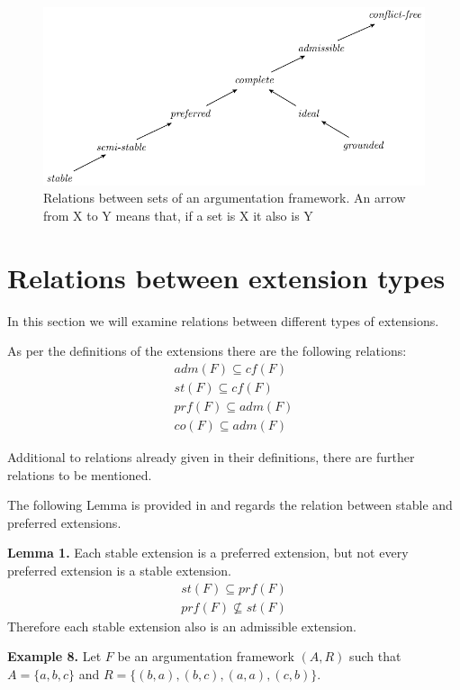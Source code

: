 \documentclass[draft,final]{vutinfth} %
\newcommand{\hl}{\par\vspace{6pt}} %
\newcommand{\cl}{\par\vspace{12pt}} %
\begin{document}
\FloatBarrier
	\begin{figure}[!h]
		\centering
		\includegraphics[scale=1]{graphs/diagram_2.pdf}
		\caption[Relations between sets of an argumentation framework]{Relations between sets of an argumentation framework. An arrow from X to Y means that, if a set is X it also is Y}
	\end{figure}
\FloatBarrier

\section{Relations between extension types}
In this section we will examine relations between different types of extensions.\hl

As per the definitions of the extensions there are the following relations:
\begin{align}
	adm(F)\subseteq cf(F)  \\ \label{eq1}
	st(F)\subseteq cf(F) \\
	prf(F)\subseteq adm(F)\\
	co(F)\subseteq adm(F)
\end{align}\cl

Additional to relations already given in their definitions, there are further relations to be mentioned.\hl
The following Lemma is provided in \cite{Dung} and regards the relation between stable and preferred extensions.\cl

\textbf{Lemma 1.}
Each stable extension is a preferred extension, but not every preferred extension is a stable extension.
\begin{align}
	st(F)\subseteq prf(F)\\
	prf(F)\not\subseteq st(F)
\end{align}
Therefore each stable extension also is an admissible extension.\cl

\textbf{Example 8.} Let $F$ be an argumentation framework $(A,R)$ such that $A=\{a,b,c\}$ and $R=\{(b,a),(b,c),(a,a),(c,b)\}$.\hl
\end{document}
